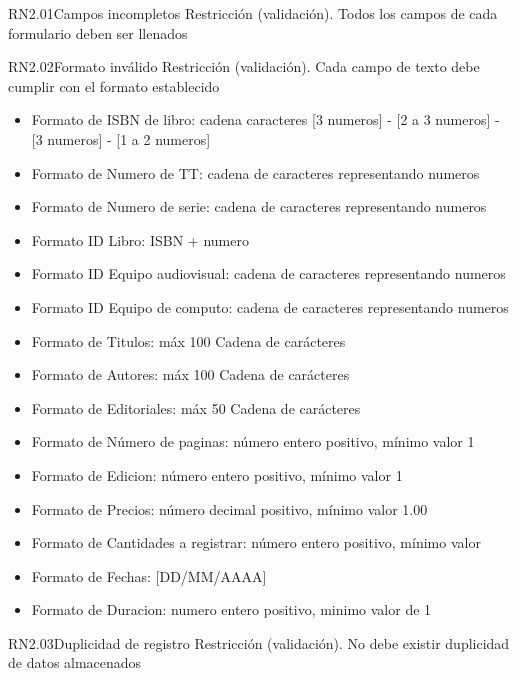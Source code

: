 
\begin{BussinesRule}{RN2.01}{Campos incompletos} 
	\BRitem[Tipo:] Restricción (validación).
	\BRitem[Descripción:] Todos los campos de cada formulario deben ser llenados
\end{BussinesRule}


\begin{BussinesRule}{RN2.02}{Formato inválido} 
	\BRitem[Tipo:] Restricción (validación).
	\BRitem[Descripción:] Cada campo de texto debe cumplir con el formato establecido
	\begin{itemize}
		\item Formato de ISBN de libro: cadena caracteres [3 numeros] - [2 a 3 numeros] - [3 numeros] - [1 a 2 numeros]
		\item Formato de Numero de TT: cadena de caracteres representando numeros
		\item Formato de Numero de serie: cadena de caracteres representando numeros
		\item Formato ID Libro: ISBN + numero
		\item Formato ID Equipo audiovisual: cadena de caracteres representando numeros
		\item Formato ID Equipo de computo: cadena de caracteres representando numeros
		
		\item Formato de Titulos: máx 100 Cadena de carácteres
		\item Formato de Autores: máx 100 Cadena de carácteres
		\item Formato de Editoriales: máx 50 Cadena de carácteres
		\item Formato de Número de paginas: número entero positivo, mínimo valor 1
		\item Formato de Edicion: número entero positivo, mínimo valor 1
		\item Formato de Precios: número decimal positivo, mínimo valor 1.00
		\item Formato de Cantidades a registrar: número entero positivo, mínimo valor
		\item Formato de Fechas: [DD/MM/AAAA] 
		\item Formato de Duracion: numero entero positivo, minimo valor de 1
	\end{itemize}
\end{BussinesRule}


\begin{BussinesRule}{RN2.03}{Duplicidad de registro} 
	\BRitem[Tipo:] Restricción (validación).
	\BRitem[Descripción:] No debe existir duplicidad de datos almacenados
\end{BussinesRule}

